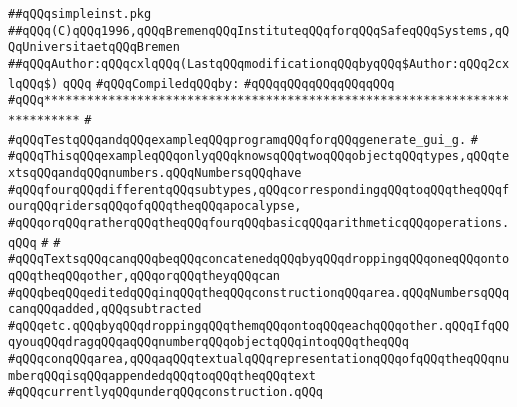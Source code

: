\label{src/lib/tk/src/toolkit/tests+examples/simpleinst.pkg}
\verb|##qQQqsimpleinst.pkg|\newline
\verb|##qQQq(C)qQQq1996,qQQqBremenqQQqInstituteqQQqforqQQqSafeqQQqSystems,qQQqUniversitaetqQQqBremen|\newline
\verb|##qQQqAuthor:qQQqcxlqQQq(LastqQQqmodificationqQQqbyqQQq$Author:qQQq2cxlqQQq$)|\newline
\verb|qQQq|\newline
\verb|#qQQqCompiledqQQqby:|\newline
\verb|#qQQqqQQqqQQqqQQqqQQq|\newline
\newline
\newline
\newline
\verb|#qQQq***************************************************************************|\newline
\verb|#|\newline
\verb|#qQQqTestqQQqandqQQqexampleqQQqprogramqQQqforqQQqgenerate_gui_g.|\newline
\verb|#|\newline
\verb|#qQQqThisqQQqexampleqQQqonlyqQQqknowsqQQqtwoqQQqobjectqQQqtypes,qQQqtextsqQQqandqQQqnumbers.qQQqNumbersqQQqhave|\newline
\verb|#qQQqfourqQQqdifferentqQQqsubtypes,qQQqcorrespondingqQQqtoqQQqtheqQQqfourqQQqridersqQQqofqQQqtheqQQqapocalypse,|\newline
\verb|#qQQqorqQQqratherqQQqtheqQQqfourqQQqbasicqQQqarithmeticqQQqoperations.qQQq|\newline
\verb|#|\newline
\verb|#|\newline
\verb|#qQQqTextsqQQqcanqQQqbeqQQqconcatenedqQQqbyqQQqdroppingqQQqoneqQQqontoqQQqtheqQQqother,qQQqorqQQqtheyqQQqcan|\newline
\verb|#qQQqbeqQQqeditedqQQqinqQQqtheqQQqconstructionqQQqarea.qQQqNumbersqQQqcanqQQqadded,qQQqsubtracted|\newline
\verb|#qQQqetc.qQQqbyqQQqdroppingqQQqthemqQQqontoqQQqeachqQQqother.qQQqIfqQQqyouqQQqdragqQQqaqQQqnumberqQQqobjectqQQqintoqQQqtheqQQq|\newline
\verb|#qQQqconqQQqarea,qQQqaqQQqtextualqQQqrepresentationqQQqofqQQqtheqQQqnumberqQQqisqQQqappendedqQQqtoqQQqtheqQQqtext|\newline
\verb|#qQQqcurrentlyqQQqunderqQQqconstruction.qQQq|\newline
